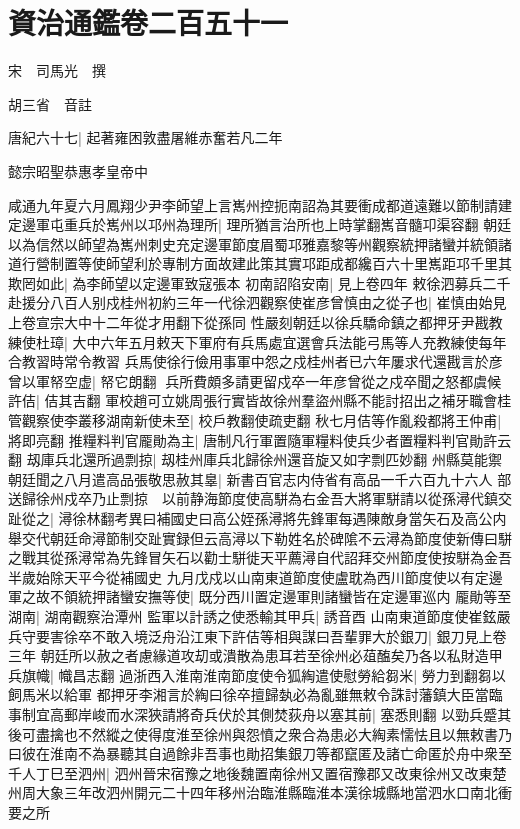 \section{資治通鑑卷二百五十一}
宋　司馬光　撰

胡三省　音註

唐紀六十七|{
	起著雍困敦盡屠維赤奮若凡二年}


懿宗昭聖恭惠孝皇帝中

咸通九年夏六月鳳翔少尹李師望上言嶲州控扼南詔為其要衝成都道遠難以節制請建定邊軍屯重兵於嶲州以邛州為理所|{
	理所猶言治所也上時掌翻嶲音髓卭渠容翻}
朝廷以為信然以師望為嶲州刺史充定邊軍節度眉蜀邛雅嘉黎等州觀察統押諸蠻并統領諸道行營制置等使師望利於專制方面故建此策其實邛距成都纔百六十里嶲距邛千里其欺罔如此|{
	為李師望以定邊軍致寇張本}
初南詔陷安南|{
	見上卷四年}
敕徐泗募兵二千赴援分八百人别戍桂州初約三年一代徐泗觀察使崔彦曾慎由之從子也|{
	崔慎由始見上卷宣宗大中十二年從才用翻下從孫同}
性嚴刻朝廷以徐兵驕命鎮之都押牙尹戡教練使杜璋|{
	大中六年五月敕天下軍府有兵馬處宜選會兵法能弓馬等人充教練使每年合教習時常令教習}
兵馬使徐行儉用事軍中怨之戍桂州者已六年屢求代還戡言於彦曾以軍帑空虚|{
	帑它朗翻}
兵所費頗多請更留戍卒一年彦曾從之戍卒聞之怒都虞候許佶|{
	佶其吉翻}
軍校趙可立姚周張行實皆故徐州羣盜州縣不能討招出之補牙職會桂管觀察使李叢移湖南新使未至|{
	校戶教翻使疏吏翻}
秋七月佶等作亂殺都將王仲甫|{
	將即亮翻}
推糧料判官龎勛為主|{
	唐制凡行軍置隨軍糧料使兵少者置糧料判官勛許云翻}
刼庫兵北還所過剽掠|{
	刼桂州庫兵北歸徐州還音旋又如字剽匹妙翻}
州縣莫能禦朝廷聞之八月遣高品張敬思赦其辠|{
	新書百官志内侍省有高品一千六百九十六人}
部送歸徐州戍卒乃止剽掠　以前静海節度使高駢為右金吾大將軍駢請以從孫潯代鎮交趾從之|{
	潯徐林翻考異曰補國史曰高公姪孫潯將先鋒軍每遇陳敵身當矢石及高公内舉交代朝廷命潯節制交趾實録但云高潯以下勒姓名於碑隂不云潯為節度使新傳曰駢之戰其從孫潯常為先鋒冒矢石以勸士駢徙天平薦潯自代詔拜交州節度使按駢為金吾半歲始除天平今從補國史}
九月戊戍以山南東道節度使盧耽為西川節度使以有定邊軍之故不領統押諸蠻安撫等使|{
	既分西川置定邊軍則諸蠻皆在定邊軍巡内}
龎勛等至湖南|{
	湖南觀察治潭州}
監軍以計誘之使悉輸其甲兵|{
	誘音酉}
山南東道節度使崔鉉嚴兵守要害徐卒不敢入境泛舟沿江東下許佶等相與謀曰吾輩罪大於銀刀|{
	銀刀見上卷三年}
朝廷所以赦之者慮緣道攻刧或潰散為患耳若至徐州必葅醢矣乃各以私財造甲兵旗幟|{
	幟昌志翻}
過浙西入淮南淮南節度使令狐綯遣使慰勞給芻米|{
	勞力到翻芻以飼馬米以給軍}
都押牙李湘言於綯曰徐卒擅歸埶必為亂雖無敕令誅討藩鎮大臣當臨事制宜高郵岸峻而水深狹請將奇兵伏於其側焚荻舟以塞其前|{
	塞悉則翻}
以勁兵蹙其後可盡擒也不然縱之使得度淮至徐州與怨憤之衆合為患必大綯素懦怯且以無敕書乃曰彼在淮南不為暴聽其自過餘非吾事也勛招集銀刀等都竄匿及諸亡命匿於舟中衆至千人丁巳至泗州|{
	泗州晉宋宿豫之地後魏置南徐州又置宿豫郡又改東徐州又改東楚州周大象三年改泗州開元二十四年移州治臨淮縣臨淮本漢徐城縣地當泗水口南北衝要之所}
